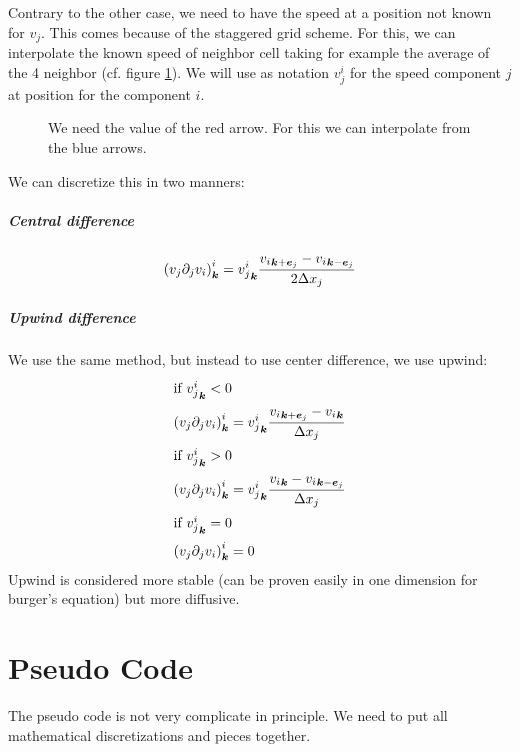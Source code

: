 \begin{remark}
  Contrary to the other case, we need to have the speed at a position not known for $v_{j}$. This comes because of the staggered grid scheme.
  For this, we can interpolate the known speed of neighbor cell taking for example the average of the 4 neighbor (cf. figure \ref{fixed:staggered_convection_upwind}).
  We will use as notation $v_{j}^{i}$ for the speed component $j$ at position for the component $i$.
  
  \begin{figure}
    \caption{We need the value of the red arrow. For this we can interpolate from  the blue arrows.}
    \label{fixed:staggered_convection_upwind}
    \end{figure}
\end{remark}
We can discretize this in two manners:

\subparagraph{Central difference}
\begin{equation}
\left(v_{j}\partial_{j}v_{i}\right)^{i}_{{\boldsymbol {k}}}={v_{j}^{i}}_{{\boldsymbol {k}}}\frac{{v_{i}}_{{\boldsymbol {k}}+{\boldsymbol {e}}_j}-{v_{i}}_{{\boldsymbol {k}}-{\boldsymbol {e}}_j}}{2\Delta x_{j}}
\end{equation}

\subparagraph{Upwind difference}

We use the same method, but instead to use center difference, we use upwind:
\begin{align}
\intertext{if ${v_{j}^{i}}_{{\boldsymbol {k}}}<0$}
\left(v_{j}\partial_{j}v_{i}\right)^{i}_{{\boldsymbol {k}}}&={v_{j}^{i}}_{{\boldsymbol {k}}}\frac{{v_{i}}_{{\boldsymbol {k}}+{\boldsymbol {e}}_j}-{v_{i}}_{{\boldsymbol {k}}}}{\Delta x_{j}}\\
\intertext{if ${v_{j}^{i}}_{{\boldsymbol {k}}}>0$}
\left(v_{j}\partial_{j}v_{i}\right)^{i}_{{\boldsymbol {k}}}&={v_{j}^{i}}_{{\boldsymbol {k}}}\frac{{v_{i}}_{{\boldsymbol {k}}}-{v_{i}}_{{\boldsymbol {k}}-{\boldsymbol {e}}_j}}{\Delta x_{j}}\\
\intertext{if ${v_{j}^{i}}_{{\boldsymbol {k}}}=0$}
\left(v_{j}\partial_{j}v_{i}\right)^{i}_{{\boldsymbol {k}}}&=0
\end{align}
Upwind is considered more stable (can be proven easily in one dimension for burger's equation) but more diffusive.

\FloatBarrier
\section{Pseudo Code}

The pseudo code is not very complicate in principle.
We need to put all mathematical discretizations and pieces together.

